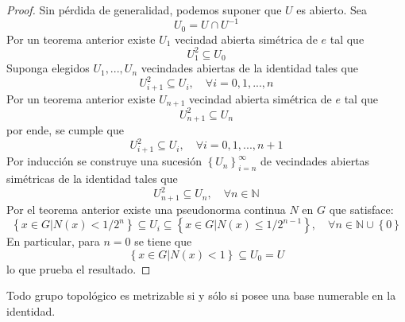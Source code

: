 \documentclass[12pt]{report}
\theoremstyle{largebreak}
\begin{document}
    \begin{proof}
        Sin pérdida de generalidad, podemos suponer que $U$ es abierto. Sea
        \begin{equation*}
            U_0=U\cap U^{ -1} 
        \end{equation*}
        Por un teorema anterior existe $U_1$ vecindad abierta simétrica de $e$ tal que
        \begin{equation*}
            U_1^2\subseteq U_0
        \end{equation*}
        Suponga elegidos $U_1,...,U_n$ vecindades abiertas de la identidad tales que
        \begin{equation*}
            U_{ i+1}^2\subseteq U_i,\quad\forall i=0,1,...,n
        \end{equation*}
        Por un teorema anterior existe $U_{ n+1}$ vecindad abierta simétrica de $e$ tal que
        \begin{equation*}
            U_{ n+1}^2\subseteq U_n
        \end{equation*}
        por ende, se cumple que
        \begin{equation*}
            U_{ i+1}^2\subseteq U_i,\quad\forall i=0,1,...,n+1
        \end{equation*}
        Por inducción se construye una sucesión $\left\{U_n \right\}_{ i=n}^\infty$ de vecindades abiertas simétricas de la identidad tales que
        \begin{equation*}
            U_{ n+1}^2\subseteq U_n,\quad\forall n\in\mathbb{N}
        \end{equation*}
        Por el teorema anterior existe una pseudonorma continua $N$ en $G$ que satisface:
        \begin{equation*}
            \left\{x\in G\Big|N(x)<1/2^n \right\}\subseteq U_i\subseteq\left\{x\in G\Big| N(x)\leq 1/2^{ n-1} \right\},\quad\forall n\in\mathbb{N}\cup\left\{0\right\}
        \end{equation*}
        En particular, para $n=0$ se tiene que
        \begin{equation*}
            \left\{x\in G\Big| N(x)<1 \right\}\subseteq U_0=U
        \end{equation*}
        lo que prueba el resultado.
    \end{proof}

    \begin{theor}
        Todo grupo topológico es metrizable si y sólo si posee una base numerable en la identidad.
    \end{theor}
\end{document}
